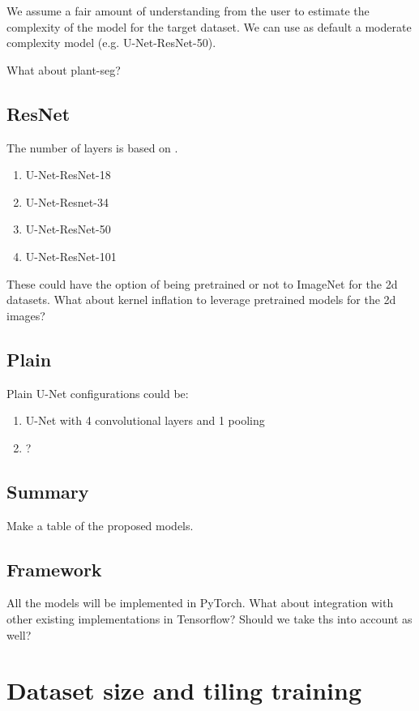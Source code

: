 \documentclass[12pt, a4paper]{article}
\begin{document}
We assume a fair amount of understanding from the user to estimate the complexity of the model for the target dataset. We can use as default a moderate complexity model (e.g. U-Net-ResNet-50).

What about plant-seg?


\subsection{ResNet}

The number of layers is based on \cite{heDeepResidualLearning2015}.

\begin{enumerate}
    \item U-Net-ResNet-18
    \item U-Net-Resnet-34
    \item U-Net-ResNet-50
    \item U-Net-ResNet-101
\end{enumerate}

These could have the option of being pretrained or not to ImageNet for the 2d datasets. What about kernel inflation to leverage pretrained models for the 2d images?

\subsection{Plain}

Plain U-Net configurations could be:
\begin{enumerate}
    \item U-Net with 4 convolutional layers and 1 pooling
    \item ?
\end{enumerate}


\subsection{Summary}

Make a table of the proposed models.

\subsection{Framework}

All the models will be implemented in PyTorch. What about integration with other existing implementations in Tensorflow? Should we take ths into account as well?

\section{Dataset size and tiling training}
\label{sec:tiling}
\end{document}
